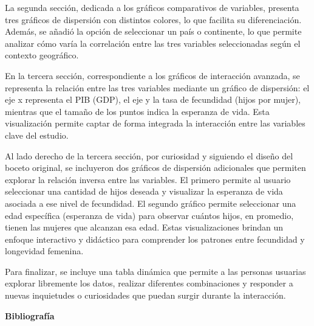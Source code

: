 \documentclass[
]{article}
\begin{document}
La segunda sección, dedicada a los gráficos comparativos de variables,
presenta tres gráficos de dispersión con distintos colores, lo que
facilita su diferenciación. Además, se añadió la opción de seleccionar
un país o continente, lo que permite analizar cómo varía la correlación
entre las tres variables seleccionadas según el contexto geográfico.

En la tercera sección, correspondiente a los gráficos de interacción
avanzada, se representa la relación entre las tres variables mediante un
gráfico de dispersión: el eje x representa el PIB (GDP), el eje y la
tasa de fecundidad (hijos por mujer), mientras que el tamaño de los
puntos indica la esperanza de vida. Esta visualización permite captar de
forma integrada la interacción entre las variables clave del estudio.

Al lado derecho de la tercera sección, por curiosidad y siguiendo el
diseño del boceto original, se incluyeron dos gráficos de dispersión
adicionales que permiten explorar la relación inversa entre las
variables. El primero permite al usuario seleccionar una cantidad de
hijos deseada y visualizar la esperanza de vida asociada a ese nivel de
fecundidad. El segundo gráfico permite seleccionar una edad específica
(esperanza de vida) para observar cuántos hijos, en promedio, tienen las
mujeres que alcanzan esa edad. Estas visualizaciones brindan un enfoque
interactivo y didáctico para comprender los patrones entre fecundidad y
longevidad femenina.

Para finalizar, se incluye una tabla dinámica que permite a las personas
usuarias explorar libremente los datos, realizar diferentes
combinaciones y responder a nuevas inquietudes o curiosidades que puedan
surgir durante la interacción.

\textbf{Bibliografía}
\end{document}
